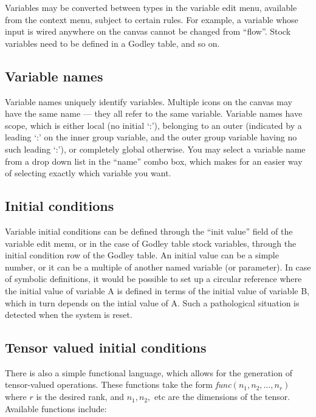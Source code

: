 Variables may be converted between types in the variable edit menu,
available from the context menu, subject to certain rules. For
example, a variable whose input is wired anywhere on the canvas cannot
be changed from ``flow''. Stock variables need to be defined in a
Godley table, and so on.

\subsection{Variable names}

Variable names uniquely identify variables. Multiple icons on the
canvas may have the same name --- they all refer to the same
variable. Variable names have scope, which is either local (no initial
`:'), belonging to an outer  (indicated by a
leading `:' on the inner group variable, and the outer group variable
having no such leading `:'), or completely global otherwise. You may
select a variable name from a drop down list in the ``name'' combo
box, which makes for an easier way of selecting exactly which variable
you want.

\subsection{Initial conditions}\label{var:init}

Variable initial conditions can be defined through the ``init value''
field of the variable edit menu, or in the case of Godley table stock
variables, through the initial condition row of the Godley table. An
initial value can be a simple number, or it can be a multiple of
another named variable (or parameter). In case of symbolic
definitions, it would be possible to set up a circular reference where
the initial value of variable A is defined in terms of the initial
value of variable B, which in turn depends on the intial value of
A. Such a pathological situation is detected when the system is reset.

\subsection{Tensor valued initial
  conditions}\label{tensor-init}

There is also a simple functional language, which allows for the
generation of tensor-valued operations. These functions take the form
{\em func}$(n_1,n_2,\ldots,n_r)$ where $r$ is the desired rank, and
$n_1,n_2,$ etc are the dimensions of the tensor. Available functions
include:

